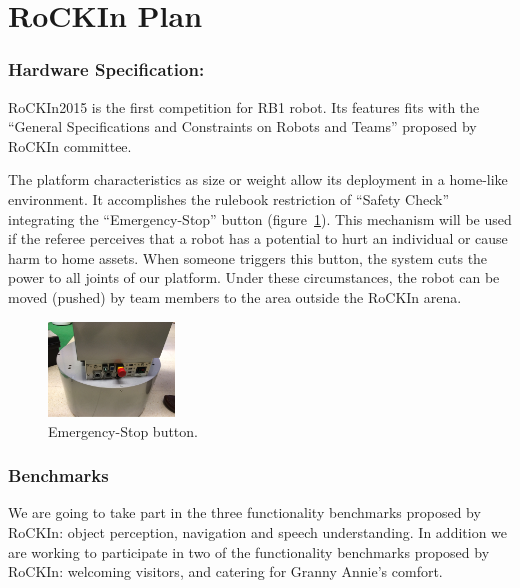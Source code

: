\documentclass[conference]{IEEEtran}
\begin{document}
\section{RoCKIn Plan}
\label{sec:rockinplan}

\subsubsection{Hardware Specification:}

RoCKIn2015 is the first competition for RB1 robot. Its features fits with the ``General Specifications and Constraints on Robots and Teams'' proposed by RoCKIn committee. 

The platform characteristics as size or weight allow its deployment  in a home-like environment. 
It accomplishes the rulebook restriction of ``Safety Check'' integrating the “Emergency-Stop” button (figure~\ref{fig:button}). This mechanism will be used if the referee perceives that a robot has a potential to hurt an individual or cause harm to home  assets. When someone triggers this button, the system cuts the power to all joints of our platform. Under these circumstances, the robot can be moved (pushed) by team members to the area outside  the RoCKIn arena.

\begin{figure}[ht]
  \centering
  \includegraphics[width=0.3\textwidth]{111}
  \caption{Emergency-Stop button.} 
  \label{fig:button}
\end{figure}


\subsubsection{Benchmarks}

We are going to take part in the three functionality benchmarks proposed by RoCKIn: 
object perception, navigation and speech understanding. 
In addition we are working to participate in two of the functionality benchmarks proposed by RoCKIn: 
welcoming visitors, and catering for Granny Annie's comfort. 
\end{document}
